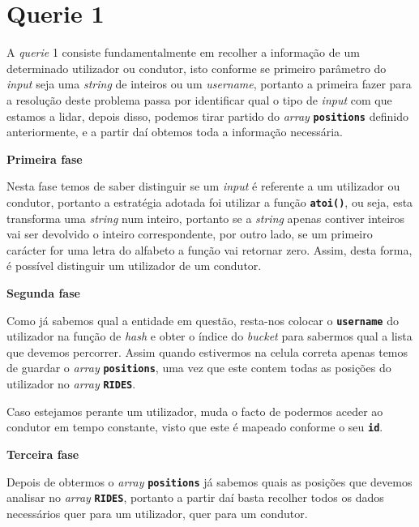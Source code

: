 \documentclass[12pt,a4paper]{report}
\begin{document}
\section{Querie 1}

A \textit{querie} 1 consiste fundamentalmente em recolher a informação de um determinado utilizador ou condutor, isto conforme se primeiro parâmetro do \textit{input} seja uma \textit{string} de inteiros ou um \textit{username}, portanto a primeira fazer para a resolução deste problema passa por identificar qual o tipo de \textit{input} com que estamos a lidar, depois disso, podemos tirar partido do \textit{array} \textbf{\small\texttt{positions}} definido anteriormente, e a partir daí obtemos toda a informação necessária.    

\normalsize\textbf{Primeira fase }{\titlerule[0.5pt]}

Nesta fase temos de saber distinguir se um \textit{input} é referente a um utilizador ou condutor, portanto a estratégia adotada foi utilizar a função \textbf{\small\texttt{atoi()}}, ou seja, esta transforma uma \textit{string} num inteiro, portanto se a \textit{string} apenas contiver inteiros vai ser devolvido o inteiro correspondente, por outro lado, se um primeiro carácter for uma letra do alfabeto a função vai retornar zero. Assim, desta forma, é possível distinguir um utilizador de um condutor.  

\normalsize\textbf{Segunda fase }{\titlerule[0.5pt]}

Como já sabemos qual a entidade em questão, resta-nos colocar o \textbf{\small\texttt{username}} do utilizador na função de \textit{hash} e obter o índice do \textit{bucket} para sabermos qual a lista que devemos percorrer. Assim quando estivermos na celula correta apenas temos de guardar o \textit{array} \textbf{\small\texttt{positions}}, uma vez que este contem todas as posições do utilizador no \textit{array} \textbf{\small\texttt{RIDES}}.

Caso estejamos perante um utilizador, muda o facto de podermos aceder ao condutor em tempo constante, visto que este é mapeado conforme o seu \textbf{\small\texttt{id}}.

\normalsize\textbf{Terceira fase }{\titlerule[0.5pt]}

Depois de obtermos o \textit{array} \textbf{\small\texttt{positions}} já sabemos quais as posições que devemos analisar no \textit{array} \textbf{\small\texttt{RIDES}}, portanto a partir daí basta recolher todos os dados necessários quer para um utilizador, quer para um condutor.
\end{document}
